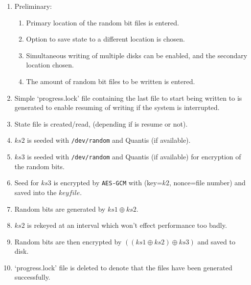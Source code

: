 \documentclass{paper}
\begin{document}
					\begin{enumerate}
						\setlength\itemsep{-0.3em}
						\item Preliminary:
						\vspace{-0.75em}
						\begin{enumerate}
							\setlength\itemsep{-0.3em}
							\item Primary location of the random bit files is entered.
							\item Option to save state to a different location is chosen.
							\item Simultaneous writing of multiple disks can be enabled, and the secondary location chosen.
							\item The amount of random bit files to be written is entered.
						\end{enumerate}
	
						
						\item Simple `progress.lock' file containing the last file to start being written to is generated to enable resuming of writing if the system is interrupted.
						\item State file is created/read, (depending if is resume or not).
						\item $\mathit{ks2}$ is seeded with \texttt{/dev/random} and Quantis (if available).
						\item $\mathit{ks3}$ is seeded with \texttt{/dev/random} and Quantis (if available) for encryption of the random bits.
						\item Seed for $\mathit{ks3}$ is encrypted by \texttt{AES-GCM} with (key=$\mathit{k2}$, nonce=file number) and saved into the $\mathit{keyfile}$.
						\item Random bits are generated by $\mathit{ks1} \oplus \mathit{ks2}$.
						\item $\mathit{ks2}$ is rekeyed at an interval which won't effect performance too badly.
						\item Random bits are then encrypted by $((\mathit{ks1} \oplus \mathit{ks2}) \oplus\mathit{ks3})$ and saved to disk.
						\item `progress.lock' file is deleted to denote that the files have been generated successfully.
					\end{enumerate}
				
\end{document}
